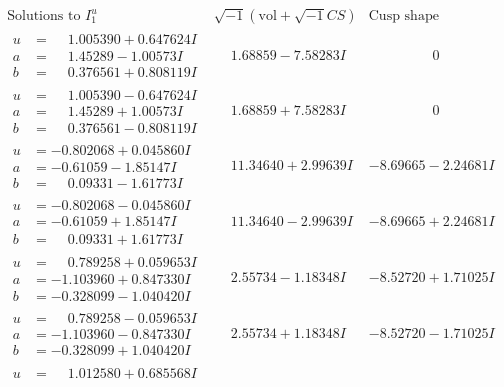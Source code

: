 \documentclass[1p]{elsarticle_modified}
\theoremstyle{definition}
\newcommand{\I}{\sqrt{-1}}
\begin{document}
$$\begin{array}{c|c|c}
\text{Solutions to }I^u_{1}& \I (\text{vol} + \sqrt{-1}CS) & \text{Cusp shape}\\
 \hline 
\begin{aligned}
u &= \phantom{-}1.005390 + 0.647624 I \\
a &= \phantom{-}1.45289 - 1.00573 I \\
b &= \phantom{-}0.376561 + 0.808119 I\end{aligned}
 & \phantom{-}1.68859 - 7.58283 I & \phantom{-0.000000 } 0 \\ \hline\begin{aligned}
u &= \phantom{-}1.005390 - 0.647624 I \\
a &= \phantom{-}1.45289 + 1.00573 I \\
b &= \phantom{-}0.376561 - 0.808119 I\end{aligned}
 & \phantom{-}1.68859 + 7.58283 I & \phantom{-0.000000 } 0 \\ \hline\begin{aligned}
u &= -0.802068 + 0.045860 I \\
a &= -0.61059 - 1.85147 I \\
b &= \phantom{-}0.09331 - 1.61773 I\end{aligned}
 & \phantom{-}11.34640 + 2.99639 I & -8.69665 - 2.24681 I \\ \hline\begin{aligned}
u &= -0.802068 - 0.045860 I \\
a &= -0.61059 + 1.85147 I \\
b &= \phantom{-}0.09331 + 1.61773 I\end{aligned}
 & \phantom{-}11.34640 - 2.99639 I & -8.69665 + 2.24681 I \\ \hline\begin{aligned}
u &= \phantom{-}0.789258 + 0.059653 I \\
a &= -1.103960 + 0.847330 I \\
b &= -0.328099 - 1.040420 I\end{aligned}
 & \phantom{-}2.55734 - 1.18348 I & -8.52720 + 1.71025 I \\ \hline\begin{aligned}
u &= \phantom{-}0.789258 - 0.059653 I \\
a &= -1.103960 - 0.847330 I \\
b &= -0.328099 + 1.040420 I\end{aligned}
 & \phantom{-}2.55734 + 1.18348 I & -8.52720 - 1.71025 I \\ \hline\begin{aligned}
u &= \phantom{-}1.012580 + 0.685568 I \\

\end{aligned}
\end{array}$$
\end{document}

